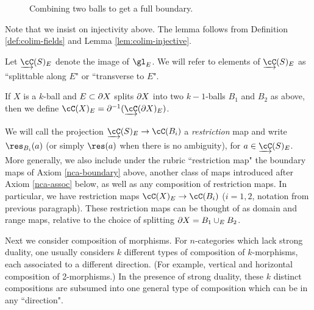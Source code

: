 \begin{figure}[!ht] \centering
{}
\caption{Combining two balls to get a full boundary.}\label{blah3}\end{figure}

Note that we insist on injectivity above. 
The lemma follows from Definition \ref{def:colim-fields} and Lemma \ref{lem:colim-injective}.

Let $\cl{\cC}(S)_E$ denote the image of $\gl_E$.
We will refer to elements of $\cl{\cC}(S)_E$ as ``splittable along $E$" or ``transverse to $E$". 

If $X$ is a $k$-ball and $E \subset \partial X$ splits $\partial X$ into two $k{-}1$-balls $B_1$ and $B_2$
as above, then we define $\cC(X)_E = \bd^{-1}(\cl{\cC}(\bd X)_E)$.

We will call the projection $\cl{\cC}(S)_E \to \cC(B_i)$
a {\it restriction} map and write $\res_{B_i}(a)$
(or simply $\res(a)$ when there is no ambiguity), for $a\in \cl{\cC}(S)_E$.
More generally, we also include under the rubric ``restriction map"
the boundary maps of Axiom \ref{nca-boundary} above,
another class of maps introduced after Axiom \ref{nca-assoc} below, as well as any composition
of restriction maps.
In particular, we have restriction maps $\cC(X)_E \to \cC(B_i)$
($i = 1, 2$, notation from previous paragraph).
These restriction maps can be thought of as 
domain and range maps, relative to the choice of splitting $\partial X = B_1 \cup_E B_2$.


Next we consider composition of morphisms.
For $n$-categories which lack strong duality, one usually considers
$k$ different types of composition of $k$-morphisms, each associated to a different direction.
(For example, vertical and horizontal composition of 2-morphisms.)
In the presence of strong duality, these $k$ distinct compositions are subsumed into 
one general type of composition which can be in any ``direction".


